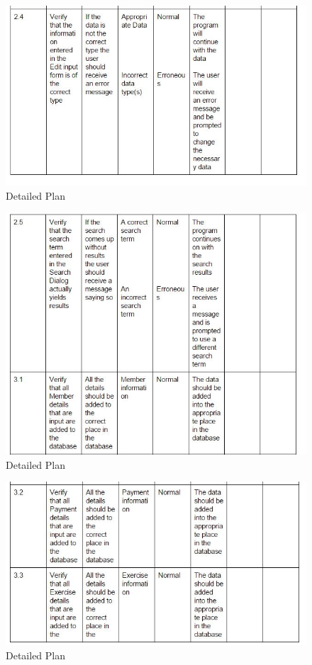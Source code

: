\begin{itemize}
\begin{figure}[H]
    \includegraphics[width=\textwidth]{DP20.JPG}
    \caption{Detailed Plan} \label{fig:VDetailed Plan}
\end{figure}

\begin{figure}[H]
    \includegraphics[width=\textwidth]{DP21.JPG}
    \caption{Detailed Plan} \label{fig:VDetailed Plan}
\end{figure}

\begin{figure}[H]
    \includegraphics[width=\textwidth]{DP22.JPG}
    \caption{Detailed Plan} \label{fig:VDetailed Plan}
\end{figure}


\end{itemize}
